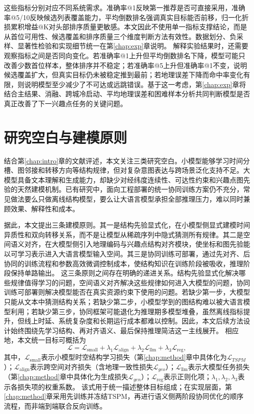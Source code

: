 这些指标分别对应不同系统需求。准确率@1反映第一推荐是否可直接采用，准确率@5/10反映候选列表覆盖能力，平均倒数排名强调真实目标能否前移，归一化折损累积增益@K对头部排序质量更敏感。本文因此不使用单一指标支撑结论，而是从首位可用性、候选覆盖和排序质量三个维度判断方法有效性。数据划分、负采样、显著性检验和实现细节统一在第\ref{chap:exp}章说明。
解释实验结果时，还需要观察指标之间是否同向变化。若准确率@1上升但平均倒数排名下降，模型可能只改善少数首位样本，整体排序并不稳定；若准确率@5上升但准确率@1不变，说明候选覆盖扩大，但真实目标仍未被稳定推到最前；若地理误差下降而命中率变化有限，则说明模型至少减少了不可达或远跳错误。基于这一考虑，第\ref{chap:exp}章将结合主结果、消融、跨城冷启动、平均地理误差和困难样本分析共同判断模型是否真正改善了下一兴趣点任务的关键问题。

\section{研究空白与建模原则}
结合第\ref{chap:intro}章的文献评述，本文关注三类研究空白。小模型能够学习时间分槽、图邻接和转移方向等结构规律，但对复杂意图表达与跨场景泛化支持不足。大模型具备文本理解和生成能力，却缺少对经纬度连续性、可达性约束和兴趣点图先验的天然建模机制。已有研究中，面向工程部署的统一协同训练方案仍不充分，常见做法要么只做离线结构模型，要么让大语言模型承担全部推理压力，难以同时兼顾效果、解释性和成本。

据此，本文提出三条建模原则。其一是结构先验显式化，在小模型侧显式建模时间异质性和双向转移关系，而不是让模型从稀疏序列中隐式猜测所有规律。其二是空间语义对齐，在大模型侧引入地理编码与兴趣点结构对齐模块，使坐标和图先验能以可学习表示进入大语言模型输入空间。其三是协同训练可部署，通过先对齐、后协同的训练流程和参数高效微调控制成本，使结构知识在训练阶段被吸收，推理阶段保持单路输出。
这三条原则之间存在明确的递进关系。结构先验显式化解决哪些规律值得学习的问题，空间语义对齐解决这些规律如何进入大模型的问题，协同训练可部署则解决模型能否在真实资源约束下使用的问题。若缺少第一步，大模型只能从文本中猜测结构关系；若缺少第二步，小模型学到的图结构难以被大语言模型利用；若缺少第三步，协同框架可能退化为推理期多模型堆叠，虽然离线指标提升，但线上时延、系统复杂度和长期运行成本都难以控制。因此，本文后续方法设计始终围绕先学习结构、再对齐语义、最后保持推理简洁这一主线展开。
相应地，本文统一目标可概括为
\begin{equation}
\mathcal{L}=\mathcal{L}_{\text{small}}+\lambda_1\mathcal{L}_{\text{align}}+\lambda_2\mathcal{L}_{\text{llm}}+\lambda_3\mathcal{L}_{\text{reg}},
\label{eq:c2-joint}
\end{equation}
其中，$\mathcal{L}_{\text{small}}$表示小模型时空结构学习损失（第\ref{chap:method}章中具体化为$\mathcal{L}_{TSPM}$）；$\mathcal{L}_{\text{align}}$表示跨空间对齐损失（含地理一致性损失$\mathcal{L}_{geo}$）；$\mathcal{L}_{\text{llm}}$表示大模型任务损失（第\ref{chap:method}章中具体化为生成损失$\mathcal{L}_{gen}$）；$\mathcal{L}_{\text{reg}}$表示正则化项；$\lambda_1,\lambda_2,\lambda_3$表示各损失项的权重系数。
该式用于统一描述整体目标组成；在实现层面，第\ref{chap:method}章采用先训练并冻结TSPM，再进行语义侧两阶段协同优化的顺序流程，而非端到端联合反向训练。

